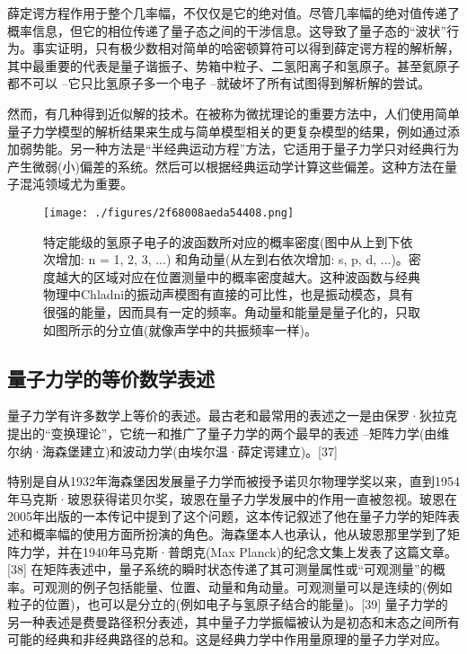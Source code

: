 薛定谔方程作用于整个几率幅，不仅仅是它的绝对值。尽管几率幅的绝对值传递了概率信息，但它的相位传递了量子态之间的干涉信息。这导致了量子态的“波状”行为。事实证明，只有极少数相对简单的哈密顿算符可以得到薛定谔方程的解析解，其中最重要的代表是量子谐振子、势箱中粒子、二氢阳离子和氢原子。甚至氦原子都不可以 –它只比氢原子多一个电子 –就破坏了所有试图得到解析解的尝试。

然而，有几种得到近似解的技术。在被称为微扰理论的重要方法中，人们使用简单量子力学模型的解析结果来生成与简单模型相关的更复杂模型的结果，例如通过添加弱势能。另一种方法是“半经典运动方程”方法，它适用于量子力学只对经典行为产生微弱(小)偏差的系统。然后可以根据经典运动学计算这些偏差。这种方法在量子混沌领域尤为重要。

\begin{figure}[ht]
\centering
\texttt{[image: ./figures/2f68008aeda54408.png]}
\caption{特定能级的氢原子电子的波函数所对应的概率密度(图中从上到下依次增加: n = 1, 2, 3, ...) 和角动量(从左到右依次增加: s, p, d, ...)。密度越大的区域对应在位置测量中的概率密度越大。这种波函数与经典物理中Chladni的振动声模图有直接的可比性，也是振动模态，具有很强的能量，因而具有一定的频率。角动量和能量是量子化的，只取如图所示的分立值(就像声学中的共振频率一样)。} \label{fig_LZLX_3}
\end{figure}

\subsection{量子力学的等价数学表述}
量子力学有许多数学上等价的表述。最古老和最常用的表述之一是由保罗·狄拉克提出的“变换理论”，它统一和推广了量子力学的两个最早的表述 –矩阵力学(由维尔纳·海森堡建立)和波动力学(由埃尔温·薛定谔建立)。[37]

特别是自从1932年海森堡因发展量子力学而被授予诺贝尔物理学奖以来，直到1954年马克斯·玻恩获得诺贝尔奖，玻恩在量子力学发展中的作用一直被忽视。玻恩在2005年出版的一本传记中提到了这个问题，这本传记叙述了他在量子力学的矩阵表述和概率幅的使用方面所扮演的角色。海森堡本人也承认，他从玻恩那里学到了矩阵力学，并在1940年马克斯·普朗克(Max Planck)的纪念文集上发表了这篇文章。[38] 在矩阵表述中，量子系统的瞬时状态传递了其可测量属性或“可观测量”的概率。可观测的例子包括能量、位置、动量和角动量。可观测量可以是连续的(例如粒子的位置)，也可以是分立的(例如电子与氢原子结合的能量)。[39] 量子力学的另一种表述是费曼路径积分表述，其中量子力学振幅被认为是初态和末态之间所有可能的经典和非经典路径的总和。这是经典力学中作用量原理的量子力学对应。

